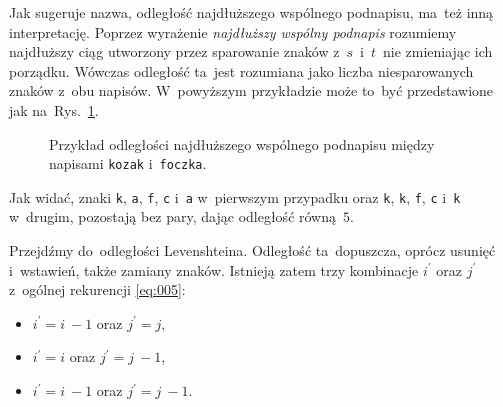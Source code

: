\documentclass{praca1}
\begin{document}
Jak sugeruje nazwa, odległość najdłuższego wspólnego podnapisu, ma~też inną interpretację. Poprzez wyrażenie \emph{najdłuższy wspólny podnapis} rozumiemy najdłuższy ciąg utworzony przez sparowanie znaków z~$s$~i~$t$~nie zmieniając ich porządku. Wówczas odległość ta~jest rozumiana jako liczba niesparowanych znaków z~obu napisów. W~powyższym przykładzie może to~być przedstawione jak na~Rys.~\ref{rys:003}.
	
	

\begin{figure}[width=80pt]
\centering
{}
\cprotect\caption{Przykład odległości najdłuższego wspólnego podnapisu między napisami \verb|kozak| i~\verb|foczka|.}\label{rys:003}
\end{figure}

Jak widać, znaki \verb|k|, \verb|a|, \verb|f|, \verb|c| i~\verb|a| w~pierwszym przypadku oraz \verb|k|, \verb|k|, \verb|f|, \verb|c| i~\verb|k| w~drugim, pozostają bez pary, dając odległość równą~$5$.





Przejdźmy do~odległości Levenshteina. Odległość ta~dopuszcza, oprócz usunięć i~wstawień, także zamiany znaków. Istnieją zatem  trzy kombinacje $i^\prime$ oraz $j^\prime$ z~ogólnej rekurencji \eqref{eq:005}:
\begin{itemize}
\item $i^\prime = i~- 1$ oraz $j^\prime = j$,
\item $i^\prime = i$ oraz $j^\prime = j~- 1$,
\item $i^\prime = i~- 1$ oraz $j^\prime = j~- 1$.
\end{itemize}
\end{document}

